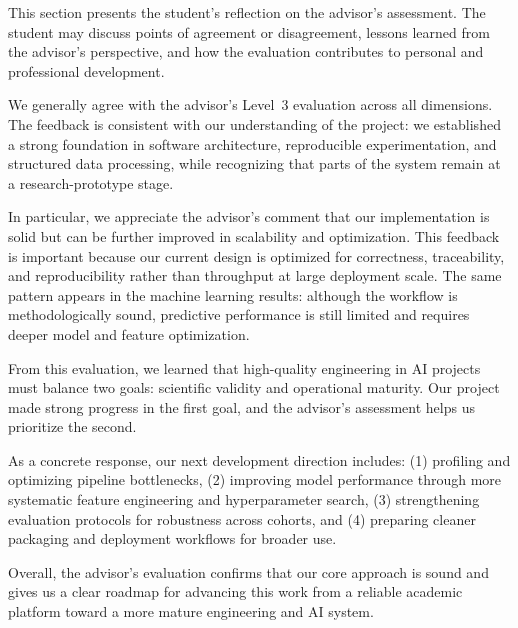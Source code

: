 This section presents the student's reflection on the advisor's assessment. The student may
discuss points of agreement or disagreement, lessons learned from the advisor's perspective,
and how the evaluation contributes to personal and professional development.

We generally agree with the advisor's Level~3 evaluation across all dimensions. The feedback
is consistent with our understanding of the project: we established a strong foundation in
software architecture, reproducible experimentation, and structured data processing, while
recognizing that parts of the system remain at a research-prototype stage.

In particular, we appreciate the advisor's comment that our implementation is solid but can be
further improved in scalability and optimization. This feedback is important because our current
design is optimized for correctness, traceability, and reproducibility rather than throughput at
large deployment scale. The same pattern appears in the machine learning results: although the
workflow is methodologically sound, predictive performance is still limited and requires deeper
model and feature optimization.

From this evaluation, we learned that high-quality engineering in AI projects must balance two
goals: scientific validity and operational maturity. Our project made strong progress in the first
goal, and the advisor's assessment helps us prioritize the second.

As a concrete response, our next development direction includes: (1) profiling and optimizing
pipeline bottlenecks, (2) improving model performance through more systematic feature
engineering and hyperparameter search, (3) strengthening evaluation protocols for robustness
across cohorts, and (4) preparing cleaner packaging and deployment workflows for broader use.

Overall, the advisor's evaluation confirms that our core approach is sound and gives us a clear
roadmap for advancing this work from a reliable academic platform toward a more mature
engineering and AI system.
